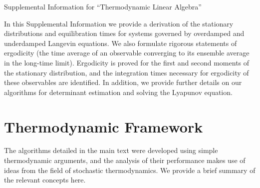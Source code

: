 \documentclass[prx,onecolumn,floatfix,longbibliography,notitlepage, nofootinbib,12pt]{revtex4-2}
\begin{document}



\pagebreak

\begin{appendix}


\begin{center}
\Large Supplemental Information for ``Thermodynamic Linear Algebra''
\end{center}



In this Supplemental Information we provide a derivation of the stationary distributions and equilibration times for systems governed by overdamped and underdamped Langevin equations. We also formulate rigorous statements of ergodicity (the time average of an observable converging to its ensemble average in the long-time limit). Ergodicity is proved for the first and second moments of the stationary distribution, and the integration times necessary for ergodicity of these observables are identified. In addition, we provide further details on our algorithms for determinant estimation and solving the Lyapunov equation.







\section{Thermodynamic Framework}

The algorithms detailed in the main text were developed using simple thermodynamic arguments, and the analysis of their performance makes use of ideas from the field of stochastic thermodynamics. We provide a brief summary of the relevant concepts here.



\end{appendix}
\end{document}
